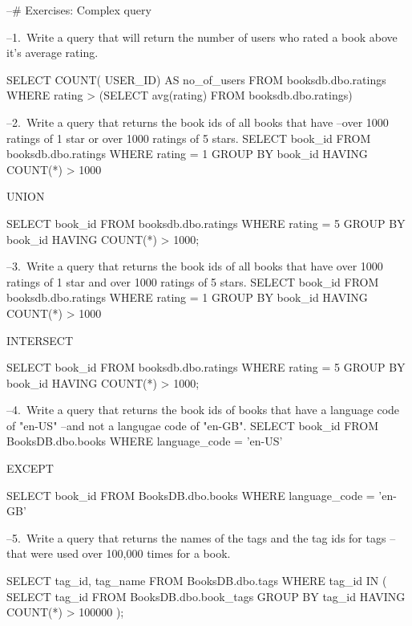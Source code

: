 
--# Exercises: Complex query

--1. Write a query that will return the number of users who rated a book above it's average rating.

SELECT  COUNT( USER_ID) AS no_of_users
FROM booksdb.dbo.ratings
WHERE rating > 
    (SELECT avg(rating) FROM booksdb.dbo.ratings)

--2. Write a query that returns the book ids of all books that have 
--over 1000 ratings of 1 star or over 1000 ratings of 5 stars.
SELECT book_id
FROM booksdb.dbo.ratings
WHERE rating = 1
GROUP BY book_id
HAVING COUNT(*) > 1000

UNION

SELECT book_id
FROM booksdb.dbo.ratings
WHERE rating = 5
GROUP BY book_id
HAVING COUNT(*) > 1000;

--3. Write a query that returns the book ids of all books that have over 1000 ratings of 1 star and over 1000 ratings of 5 stars.
SELECT book_id
FROM booksdb.dbo.ratings
WHERE rating = 1
GROUP BY book_id
HAVING COUNT(*) > 1000

INTERSECT

SELECT book_id
FROM booksdb.dbo.ratings
WHERE rating = 5
GROUP BY book_id
HAVING COUNT(*) > 1000;

--4. Write a query that returns the book ids of books that have a language code of "en-US" 
--and not a langugae code of "en-GB".
SELECT book_id 
FROM BooksDB.dbo.books 
WHERE language_code = 'en-US'

EXCEPT 

SELECT book_id 
FROM BooksDB.dbo.books 
WHERE language_code = 'en-GB'

--5. Write a query that returns the names of the tags and the tag ids for tags 
--that were used over 100,000 times for a book. 

SELECT tag_id, tag_name
FROM BooksDB.dbo.tags
WHERE tag_id IN (
    SELECT tag_id
    FROM BooksDB.dbo.book_tags
    GROUP BY tag_id
    HAVING COUNT(*) > 100000
);
